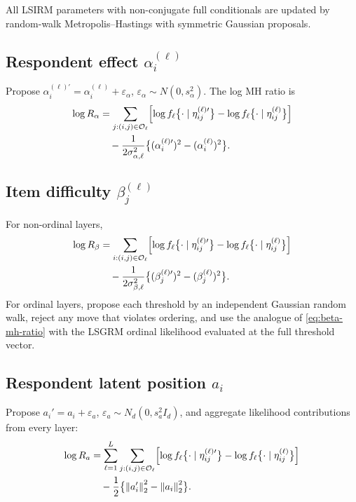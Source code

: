 \documentclass[11pt]{article}
\newcommand{\norm}[1]{\left\lVert #1 \right\rVert}
\begin{document}
All LSIRM parameters with non-conjugate full conditionals are updated by
random-walk Metropolis--Hastings with symmetric Gaussian proposals.

\subsection{Respondent effect $\alpha_i^{(\ell)}$}

Propose $\alpha_i^{(\ell)\prime}=\alpha_i^{(\ell)}+\varepsilon_\alpha$,
$\varepsilon_\alpha\sim N(0,s_\alpha^2)$.  The log MH ratio is
\begin{align}
    \log R_\alpha
    &=
    \sum_{j:(i,j)\in\mathcal{O}_\ell}
    \!\left[
    \log f_\ell\bigl\{\cdot\mid\eta_{ij}^{(\ell)\prime}\bigr\}-
    \log f_\ell\bigl\{\cdot\mid\eta_{ij}^{(\ell)}\bigr\}
    \right]
    \notag\\
    &\quad-\frac{1}{2\sigma_{\alpha,\ell}^2}
    \bigl\{(\alpha_i^{(\ell)\prime})^2-(\alpha_i^{(\ell)})^2\bigr\}.
    \label{eq:alpha-mh-ratio}
\end{align}

\subsection{Item difficulty $\beta_j^{(\ell)}$}

For non-ordinal layers,
\begin{align}
    \log R_\beta
    &=
    \sum_{i:(i,j)\in\mathcal{O}_\ell}
    \!\left[
    \log f_\ell\bigl\{\cdot\mid\eta_{ij}^{(\ell)\prime}\bigr\}-
    \log f_\ell\bigl\{\cdot\mid\eta_{ij}^{(\ell)}\bigr\}
    \right]
    \notag\\
    &\quad
    -\frac{1}{2\sigma_{\beta,\ell}^2}\bigl\{(\beta_j^{(\ell)\prime})^2-(\beta_j^{(\ell)})^2\bigr\}.
    \label{eq:beta-mh-ratio}
\end{align}
For ordinal layers, propose each threshold by an independent Gaussian random
walk, reject any move that violates ordering, and use the analogue of
\eqref{eq:beta-mh-ratio} with the LSGRM ordinal likelihood evaluated at the
full threshold vector.

\subsection{Respondent latent position $a_i$}

Propose $a_i'=a_i+\varepsilon_a$, $\varepsilon_a\sim N_d(0,s_a^2 I_d)$, and
aggregate likelihood contributions from every layer:
\begin{align}
    \log R_a
    &=
    \sum_{\ell=1}^L
    \sum_{j:(i,j)\in\mathcal{O}_\ell}
    \!\left[
    \log f_\ell\bigl\{\cdot\mid\eta_{ij}^{(\ell)\prime}\bigr\}-
    \log f_\ell\bigl\{\cdot\mid\eta_{ij}^{(\ell)}\bigr\}
    \right]
    \notag\\
    &\quad-\frac{1}{2}\bigl\{\norm{a_i'}_2^2-\norm{a_i}_2^2\bigr\}.
    \label{eq:a-mh-ratio}
\end{align}
\end{document}

